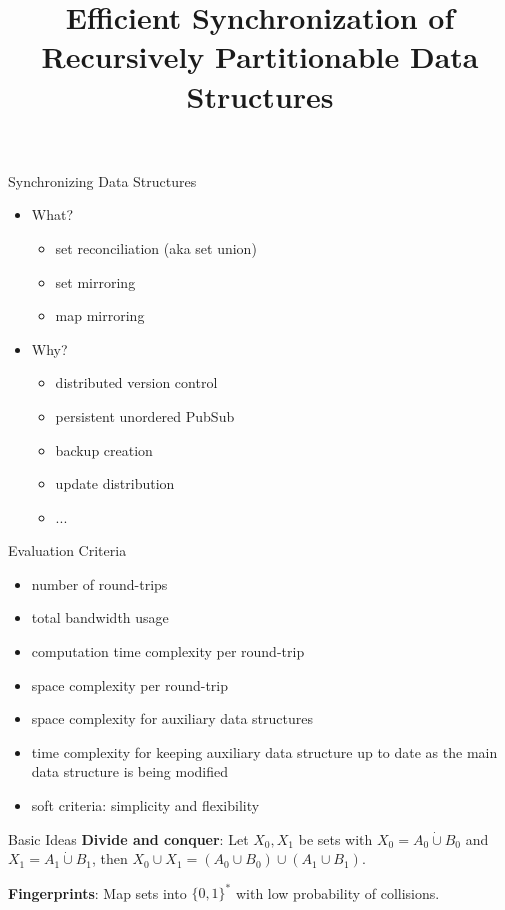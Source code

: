 \documentclass{beamer}
\title[]{Efficient Synchronization of Recursively Partitionable Data Structures}
\date{}
\newcommand{\disjointunion}[2]{{#1} \dot{\cup} {#2}}
\begin{document}
\frame{\titlepage}

\begin{frame}{Synchronizing Data Structures}
\begin{itemize}
  \item What?
  \begin{itemize}
    \item set reconciliation (aka set union)
    \item set mirroring
    \item map mirroring
  \end{itemize}
  \item Why?
    \begin{itemize}
    \item distributed version control
    \item persistent unordered PubSub
    \item backup creation
    \item update distribution
    \item ...
  \end{itemize}
\end{itemize}
\end{frame}

\begin{frame}{Evaluation Criteria}
\begin{itemize}
\item number of round-trips
\item total bandwidth usage
\item computation time complexity per round-trip
\item space complexity per round-trip
\item space complexity for auxiliary data structures
\item time complexity for keeping auxiliary data structure up to date as the main data structure is being modified
\item soft criteria: simplicity and flexibility
\end{itemize}
\end{frame}

\begin{frame}{Basic Ideas}
\textbf{Divide and conquer}: Let $X_0, X_1$ be sets with $X_0 = \disjointunion{A_0}{B_0}$ and $X_1 = \disjointunion{A_1}{B_1}$, then $X_0 \cup X_1 = (A_0 \cup B_0) \cup (A_1 \cup B_1)$.

\pause
\vspace{24pt}

\textbf{Fingerprints}: Map sets into $\{0, 1\}^{\ast}$ with low probability of collisions. 
\end{frame}
\end{document}
